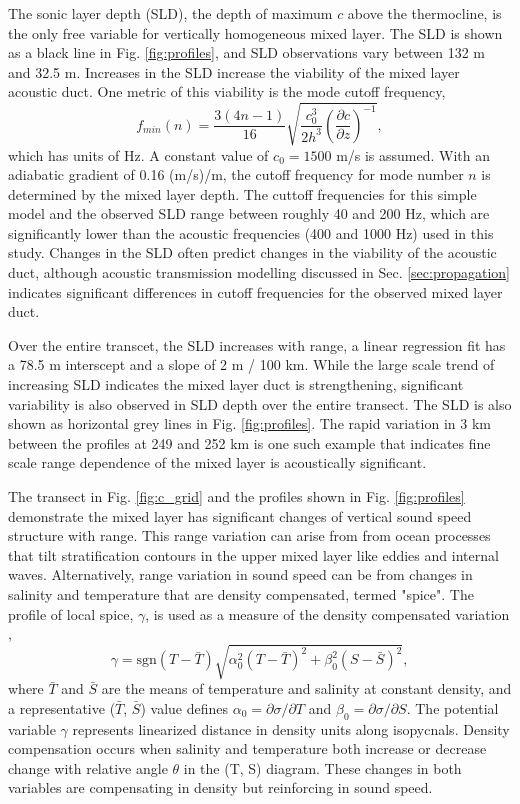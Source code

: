 \documentclass[preprint,NumberedRefs]{JASA}
\begin{document}
The sonic layer depth (SLD), the depth of maximum $c$ above the thermocline, is the only free variable for vertically homogeneous mixed layer. The SLD is shown as a black line in Fig. \ref{fig:profiles}, and SLD observations vary between 132 m and 32.5 m. Increases in the SLD increase the viability of the mixed layer acoustic duct. One metric of this viability is the mode cutoff frequency,
\begin{equation}
    f_{min}(n) = \frac{3(4n-1)}{16} \sqrt{\frac{c_0^3}{2h^3} \left( \frac{\partial c}{\partial z} \right) ^ {-1}},
    \label{eq:f_cutoff}
\end{equation}
which has units of Hz. A constant value of $c_0 = 1500$ m/s is assumed. With an adiabatic gradient of 0.16 (m/s)/m, the cutoff frequency for mode number $n$ is determined by the mixed layer depth. The cuttoff frequencies for this simple model and the observed SLD range between roughly 40 and 200 Hz, which are significantly lower than the acoustic frequencies (400 and 1000 Hz) used in this study. Changes in the SLD often predict changes in the viability of the acoustic duct, although acoustic transmission modelling discussed in Sec. \ref{sec:propagation} indicates significant differences in cutoff frequencies for the observed mixed layer duct.

Over the entire transcet, the SLD increases with range, a linear regression fit has a 78.5 m interscept and a slope of 2 m / 100 km. While the large scale trend of increasing SLD indicates the mixed layer duct is strengthening, significant variability is also observed in SLD depth over the entire transect. The SLD is also shown as horizontal grey lines in Fig. \ref{fig:profiles}. The rapid variation in 3 km between the profiles at 249 and 252 km is one such example that indicates fine scale range dependence of the mixed layer is acoustically significant.

The transect in Fig. \ref{fig:c_grid} and the profiles shown in Fig. \ref{fig:profiles} demonstrate the mixed layer has significant changes of vertical sound speed structure with range. This range variation can arise from from ocean processes that tilt stratification contours in the upper mixed layer like eddies and internal waves. Alternatively, range variation in sound speed can be from changes in salinity and temperature that are density compensated, termed "spice". The profile of local spice, $\gamma$, is used as a measure of the density compensated variation \citep{klymak2015spice},
\begin{equation}
    \gamma=\textrm{sgn}(T-\bar{T}) \sqrt{\alpha_0^2(T-\bar{T})^2 +\beta_0^2(S-\bar{S})^2},
    \label{eq:gamma}
\end{equation}
where $\bar{T}$ and $\bar{S}$ are the means of temperature and salinity at constant density, and a representative ($\bar{T}$, $\bar{S}$) value defines $\alpha_0=\partial \sigma / \partial T$ and $\beta_0=\partial \sigma / \partial S$. The potential variable $\gamma$ represents linearized distance in density units along isopycnals. Density compensation occurs when salinity and temperature both increase or decrease change with relative angle $\theta$ in the (T, S) diagram. These changes in both variables are compensating in density but reinforcing in sound speed.
\end{document}
